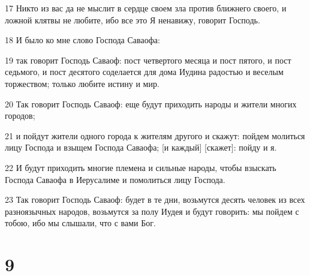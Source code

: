 \par 17 Никто из вас да не мыслит в сердце своем зла против ближнего своего, и ложной клятвы не любите, ибо все это Я ненавижу, говорит Господь.
\par 18 И было ко мне слово Господа Саваофа:
\par 19 так говорит Господь Саваоф: пост четвертого месяца и пост пятого, и пост седьмого, и пост десятого соделается для дома Иудина радостью и веселым торжеством; только любите истину и мир.
\par 20 Так говорит Господь Саваоф: еще будут приходить народы и жители многих городов;
\par 21 и пойдут жители одного города к жителям другого и скажут: пойдем молиться лицу Господа и взыщем Господа Саваофа; [и каждый] [скажет]: пойду и я.
\par 22 И будут приходить многие племена и сильные народы, чтобы взыскать Господа Саваофа в Иерусалиме и помолиться лицу Господа.
\par 23 Так говорит Господь Саваоф: будет в те дни, возьмутся десять человек из всех разноязычных народов, возьмутся за полу Иудея и будут говорить: мы пойдем с тобою, ибо мы слышали, что с вами Бог.

\chapter{9}


